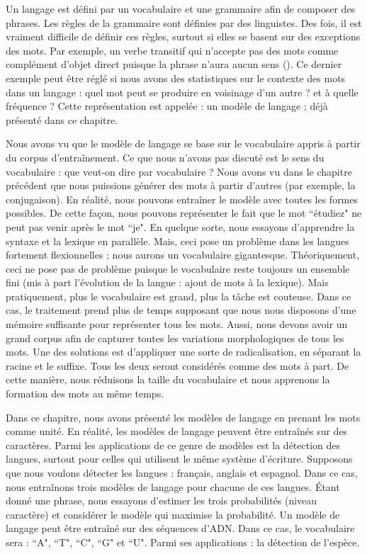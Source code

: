 \documentclass{KodeBook}
\begin{document}
\begin{discussion}

Un langage est défini par un vocabulaire et une grammaire afin de composer des phrases. 
Les règles de la grammaire sont définies par des linguistes. 
Des fois, il est vraiment difficile de définir ces règles, surtout si elles se basent sur des exceptions des mots. 
Par exemple, un verbe transitif qui n'accepte pas des mots comme complément d'objet direct puisque la phrase n'aura aucun sens (). 
Ce dernier exemple peut être réglé si nous avons des statistiques sur le contexte des mots dans un langage : quel mot peut se produire en voisinage d'un autre ? et à quelle fréquence ?
Cette représentation est appelée : un modèle de langage ; déjà présenté dans ce chapitre. 

Nous avons vu que le modèle de langage se base sur le vocabulaire appris à partir du corpus d'entraînement. 
Ce que nous n'avons pas discuté est le sens du vocabulaire : que veut-on dire par vocabulaire ?
Nous avons vu dans le chapitre précédent que nous puissions générer des mots à partir d'autres (par exemple, la conjugaison).
En réalité, nous pouvons entraîner le modèle avec toutes les formes possibles. 
De cette façon, nous pouvons représenter le fait que le mot ``étudiez" ne peut pas venir après le mot ``je".
En quelque sorte, nous essayons d'apprendre la syntaxe et la lexique en parallèle. 
Mais, ceci pose un problème dans les langues fortement flexionnelles ; nous aurons un vocabulaire gigantesque.
Théoriquement, ceci ne pose pas de problème puisque le vocabulaire reste toujours un ensemble fini (mis à part l'évolution de la langue : ajout de mots à la lexique). 
Mais pratiquement, plus le vocabulaire est grand, plus la tâche est couteuse. 
Dans ce cas, le traitement prend plus de temps supposant que nous nous disposons d'une mémoire suffisante pour représenter tous les mots. 
Aussi, nous devons avoir un grand corpus afin de capturer toutes les variations morphologiques de tous les mots. 
Une des solutions est d'appliquer une sorte de radicalisation, en séparant la racine et le suffixe. 
Tous les deux seront considérés comme des mots à part. 
De cette manière, nous réduisons la taille  du vocabulaire et nous apprenons la formation des mots au même temps. 

Dans ce chapitre, nous avons présenté les modèles de langage en prenant les mots comme unité. 
En réalité, les modèles de langage peuvent être entraînés sur des caractères. 
Parmi les applications de ce genre de modèles est la détection des langues, surtout pour celles qui utilisent le même système d'écriture. 
Supposons que nous voulons détecter les langues : français, anglais et espagnol. 
Dans ce cas, nous entraînons trois modèles de langage pour chacune de ces langues. 
Étant donné une phrase, nous essayons d'estimer les trois probabilités (niveau caractère) et considérer le modèle qui maximise la probabilité. 
Un modèle de langage peut être entraîné sur des séquences d'ADN. 
Dans ce cas, le vocabulaire sera : ``A", ``T", ``C", ``G" et ``U". 
Parmi ses applications : la détection de l'espèce. 
\end{discussion}

\ifx\wholebook\relax\else
% 
% 
	
\end{document}

